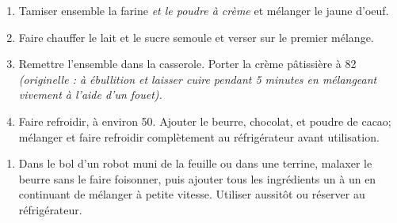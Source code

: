 
\begin{ingredients}
\end{ingredients}


\begin{recipe}
  \begin{enumerate}

  \item Tamiser ensemble la farine \textit{et le poudre à crème} et mélanger le
    jaune d’oeuf.

  \item Faire chauffer le lait et le sucre semoule et verser sur le
    premier mélange.

  \item Remettre l’ensemble dans la casserole.  Porter la crème
    pâtissière à 82\C{} \textit{(originelle : à ébullition et laisser cuire pendant 5 minutes en
      mélangeant vivement à l’aide d’un fouet).}

  \item Faire refroidir, à environ 50\C. Ajouter le beurre, chocolat,
    et poudre de cacao; mélanger et faire refroidir complètement au
    réfrigérateur avant utilisation.

  \end{enumerate}
\end{recipe}


\begin{ingredients}
\end{ingredients}


\begin{recipe}
  \begin{enumerate}

  \item Dans le bol d’un robot muni de la feuille ou dans une terrine,
    malaxer le beurre sans le faire foisonner, puis ajouter tous les
    ingrédients un à un en continuant de mélanger à petite vitesse.
    Utiliser aussitôt ou réserver au réfrigérateur.

  \end{enumerate}
\end{recipe}


